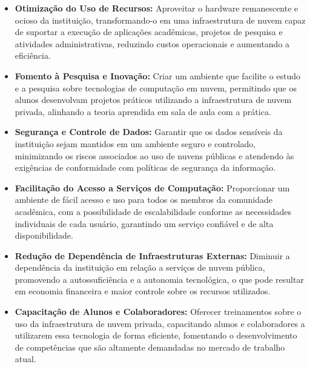 \begin{itemize}
    \item \textbf{Otimização do Uso de Recursos:} Aproveitar o hardware remanescente e ocioso da instituição, transformando-o em uma infraestrutura de nuvem capaz de suportar a execução de aplicações acadêmicas, projetos de pesquisa e atividades administrativas, reduzindo custos operacionais e aumentando a eficiência.

    \item \textbf{Fomento à Pesquisa e Inovação:} Criar um ambiente que facilite o estudo e a pesquisa sobre tecnologias de computação em nuvem, permitindo que os alunos desenvolvam projetos práticos utilizando a infraestrutura de nuvem privada, alinhando a teoria aprendida em sala de aula com a prática.

    \item \textbf{Segurança e Controle de Dados:} Garantir que os dados sensíveis da instituição sejam mantidos em um ambiente seguro e controlado, minimizando os riscos associados ao uso de nuvens públicas e atendendo às exigências de conformidade com políticas de segurança da informação.

    \item \textbf{Facilitação do Acesso a Serviços de Computação:} Proporcionar um ambiente de fácil acesso e uso para todos os membros da comunidade acadêmica, com a possibilidade de escalabilidade conforme as necessidades individuais de cada usuário, garantindo um serviço confiável e de alta disponibilidade.

    \item \textbf{Redução de Dependência de Infraestruturas Externas:} Diminuir a dependência da instituição em relação a serviços de nuvem pública, promovendo a autossuficiência e a autonomia tecnológica, o que pode resultar em economia financeira e maior controle sobre os recursos utilizados.

    \item \textbf{Capacitação de Alunos e Colaboradores:} Oferecer treinamentos sobre o uso da infraestrutura de nuvem privada, capacitando alunos e colaboradores a utilizarem essa tecnologia de forma eficiente, fomentando o desenvolvimento de competências que são altamente demandadas no mercado de trabalho atual.
\end{itemize}

